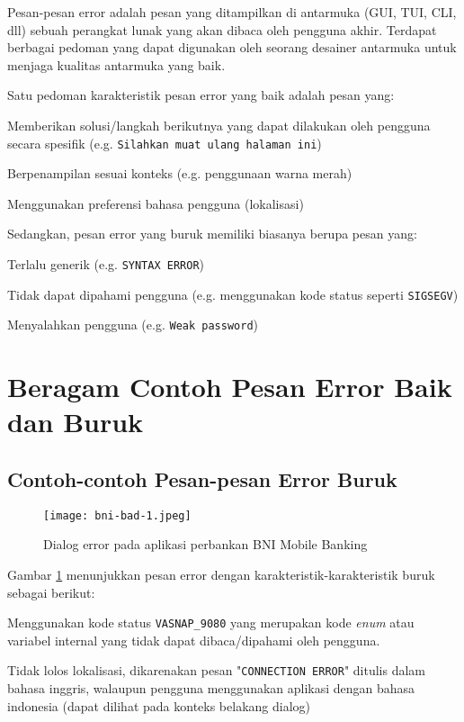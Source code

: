 \maketitle

Pesan-pesan error adalah pesan yang ditampilkan di antarmuka (GUI,
TUI, CLI, dll) sebuah perangkat lunak yang akan dibaca oleh pengguna
akhir. Terdapat berbagai pedoman yang dapat digunakan oleh seorang
desainer antarmuka untuk menjaga kualitas antarmuka yang baik.

Satu pedoman karakteristik pesan error yang baik adalah pesan yang:
\begin{pros}
\item Memberikan solusi/langkah berikutnya yang dapat dilakukan oleh
  pengguna secara spesifik (e.g. \texttt{Silahkan muat ulang halaman ini})
\item Berpenampilan sesuai konteks (e.g. penggunaan warna merah)
\item Menggunakan preferensi bahasa pengguna (lokalisasi)
\end{pros}
Sedangkan, pesan error yang buruk memiliki biasanya berupa pesan yang:
\begin{cons}
\item Terlalu generik (e.g. \texttt{SYNTAX ERROR})
\item Tidak dapat dipahami pengguna (e.g. menggunakan kode status
  seperti \texttt{SIGSEGV})
\item Menyalahkan pengguna (e.g. \texttt{Weak password})
\end{cons}

\section{Beragam Contoh Pesan Error Baik dan Buruk}
\subsection{Contoh-contoh Pesan-pesan Error Buruk}

\begin{figure}[H]
  \centering
  \texttt{[image: bni-bad-1.jpeg]}
  \caption{Dialog error pada aplikasi perbankan BNI Mobile Banking}
  \label{fig:bad-err1}
\end{figure}
Gambar \ref{fig:bad-err1} menunjukkan pesan error dengan
karakteristik-karakteristik buruk sebagai berikut:
\begin{cons}
\item Menggunakan kode status \texttt{VASNAP\_9080} yang merupakan kode
  \textit{enum} atau variabel internal yang tidak dapat
  dibaca/dipahami oleh pengguna.
\item Tidak lolos lokalisasi, dikarenakan pesan "\texttt{CONNECTION
  ERROR}" ditulis dalam bahasa inggris, walaupun pengguna menggunakan
  aplikasi dengan bahasa indonesia (dapat dilihat pada konteks belakang dialog)
\end{cons}


